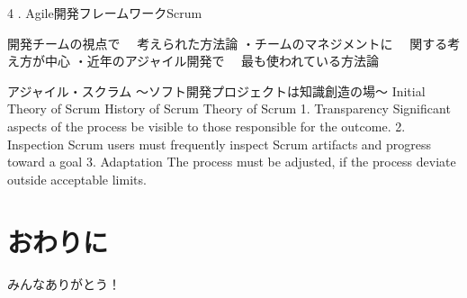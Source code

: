 \documentclass[paper]{jrsj}
\begin{document}
4 . Agile開発フレームワークScrum


開発チームの視点で
　考えられた方法論
・チームのマネジメントに
　関する考え方が中心
・近年のアジャイル開発で
　最も使われている方法論

アジャイル・スクラム
～ソフト開発プロジェクトは知識創造の場～
Initial Theory of Scrum
History of Scrum
Theory of Scrum
1.	Transparency
Significant aspects of the process be visible to those responsible for the outcome.
2.	Inspection
Scrum users must frequently  inspect Scrum artifacts and progress toward a goal
3.	Adaptation
The process must be adjusted, if the process deviate outside acceptable limits.




\section{おわりに}

\begin{acknowledgements}
みんなありがとう！\cite{takeuchi1986new}
\end{acknowledgements}





\begin{biography}
\end{biography}
\end{document}
